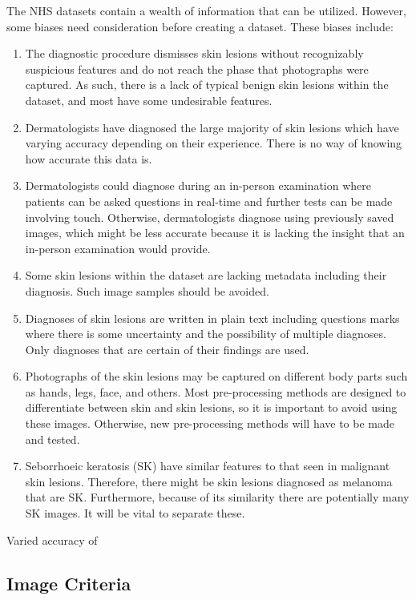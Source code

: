 The NHS datasets contain a wealth of information that can be utilized. However, some biases need consideration before creating a dataset. These biases include:
\begin{enumerate}
    \item  The diagnostic procedure dismisses skin lesions without recognizably suspicious features and do not reach the phase that photographs were captured. As such, there is a lack of typical benign skin lesions within the dataset, and most have some undesirable features.
    \item Dermatologists have diagnosed the large majority of skin lesions which have varying accuracy depending on their experience. There is no way of knowing how accurate this data is.
    \item Dermatologists could diagnose during an in-person examination where patients can be asked questions in real-time and further tests can be made involving touch. Otherwise, dermatologists diagnose using previously saved images, which might be less accurate because it is lacking the insight that an in-person examination would provide.
    \item Some skin lesions within the dataset are lacking metadata including their diagnosis. Such image samples should be avoided.
    \item Diagnoses of skin lesions are written in plain text including questions marks where there is some uncertainty and the possibility of multiple diagnoses. Only diagnoses that are certain of their findings are used.
    \item Photographs of the skin lesions may be captured on different body parts such as hands, legs, face, and others. Most pre-processing methods are designed to differentiate between skin and skin lesions, so it is important to avoid using these images. Otherwise, new pre-processing methods will have to be made and tested.
    \item Seborrhoeic keratosis (SK) have similar features to that seen in malignant skin lesions. Therefore, there might be skin lesions diagnosed as melanoma that are SK. Furthermore, because of its similarity there are potentially many SK images. It will be vital to separate these.
\end{enumerate}

Varied accuracy of 

\subsection{Image Criteria}

